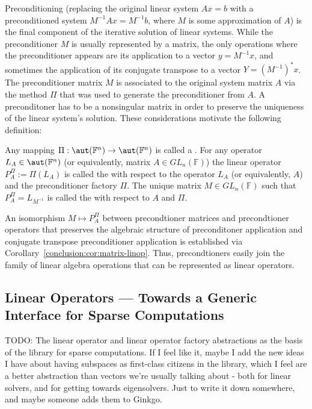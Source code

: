 Preconditioning (replacing the original linear system $Ax = b$ with a
preconditioned system $M^{-1}Ax = M^{-1}b$, where $M$ is some approximation of
$A$) is the final component of the iterative solution of linear systems. While
the preconditioner $M$ is usually represented by a matrix, the only operations
where the preconditioner appears are its application to a vector $y = M^{-1}x$,
and sometimes the application of its conjugate transpose to a vector $Y =
(M^{-1})^*x$. The preconditioner matrix $M$ is associated to the original system
matrix $A$ via the method $\Pi$ that was used to generate the preconditioner
from $A$. A preconditoner has to be a nonsingular matrix in order to preserve
the uniqueness of the linear system's solution. These considerations motivate
the following definition:

\begin{definition}
\label{conclusion:def:precond-linop}
Any mapping $\Pi : \aut(\mathbb{F}^n) \rightarrow \aut(\mathbb{F}^n)$ is called
a . For any operator $L_A \in
\aut(\mathbb{F}^n)$ (or equivalently, matrix $A \in GL_n(\mathbb{F})$) the
linear operator $P_A^\Pi := \Pi(L_A)$ is called the  with respect to the operator $L_A$ (or equivalently, $A$) and the
preconditioner factory $\Pi$.  The unique matrix $M \in GL_n(\mathbb{F})$ such
that $P_A^\Pi = L_{M^{-1}}$ is called the  with
respect to $A$ and $\Pi$.
\end{definition}

An isomorphism $M \mapsto P_A^\Pi$ between precondtioner matrices and
precondtioner operators that preserves the algebraic structure of preconditoner
application and conjugate transpose preconditioner application is established
via Corollary~\ref{conclusion:cor:matrix-linop}. Thus, precondtioners easily
join the family of linear algebra operations that can be represented as linear
operators.

\subsection{Linear Operators --- Towards a Generic Interface for Sparse
            Computations}
TODO: The linear operator and linear operator factory abstractions as the basis
      of the library for sparse computations.
      If I feel like it, maybe I add the new ideas I have about having subspaces
      as first-class citizens in the library, which I feel are a better
      abstraction than vectors we're usually talking about - both for linear
      solvers, and for getting towards eigensolvers. Just to write it down
      somewhere, and maybe someone adds them to Ginkgo.
